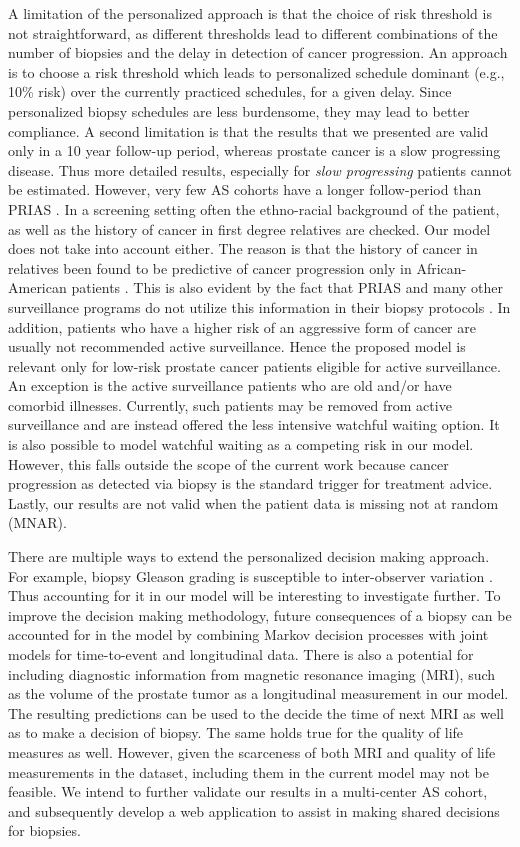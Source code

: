 A limitation of the personalized approach is that the choice of risk threshold is not straightforward, as different thresholds lead to different combinations of the number of biopsies and the delay in detection of cancer progression. An approach is to choose a risk threshold which leads to personalized schedule dominant (e.g., 10\% risk) over the currently practiced schedules, for a given delay. Since personalized biopsy schedules are less burdensome, they may lead to better compliance. A second limitation is that the results that we presented are valid only in a 10 year follow-up period, whereas prostate cancer is a slow progressing disease. Thus more detailed results, especially for \textit{slow progressing} patients cannot be estimated. However, very few AS cohorts have a longer follow-period than PRIAS \cite{bruinsma2016active}. In a screening setting often the ethno-racial background of the patient, as well as the history of cancer in first degree relatives are checked. Our model does not take into account either. The reason is that the history of cancer in relatives been found to be predictive of cancer progression only in African-American patients \cite{goh2013clinical,telang2017prostate}. This is also evident by the fact that PRIAS and many other surveillance programs do not utilize this information in their biopsy protocols \cite{bokhorst2016decade,nieboer2018active}. In addition, patients who have a higher risk of an aggressive form of cancer are usually not recommended active surveillance. Hence the proposed model is relevant only for low-risk prostate cancer patients eligible for active surveillance. An exception is the active surveillance patients who are old and/or have comorbid illnesses. Currently, such patients may be removed from active surveillance and are instead offered the less intensive watchful waiting \cite{bokhorst2016decade} option. It is also possible to model watchful waiting as a competing risk in our model. However, this falls outside the scope of the current work because cancer progression as detected via biopsy is the standard trigger for treatment advice. Lastly, our results are not valid when the patient data is missing not at random (MNAR).

There are multiple ways to extend the personalized decision making approach. For example, biopsy Gleason grading is susceptible to inter-observer variation \cite{coley2017}. Thus accounting for it in our model will be interesting to investigate further. To improve the decision making methodology, future consequences of a biopsy can be accounted for in the model by combining Markov decision processes with joint models for time-to-event and longitudinal data. There is also a potential for including diagnostic information from magnetic resonance imaging (MRI), such as the volume of the prostate tumor as a longitudinal measurement in our model. The resulting predictions can be used to the decide the time of next MRI as well as to make a decision of biopsy. The same holds true for the quality of life measures as well. However, given the scarceness of both MRI and quality of life measurements in the dataset, including them in the current model may not be feasible. We intend to further validate our results in a multi-center AS cohort, and subsequently develop a web application to assist in making shared decisions for biopsies.